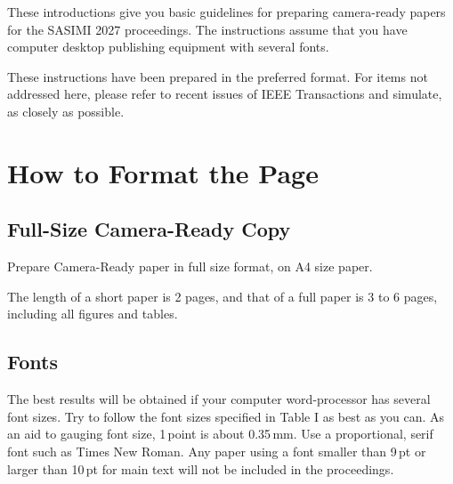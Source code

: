 \documentclass[twocolumn,a4paper]{article}
\begin{document}
These introductions give you basic guidelines for
preparing camera-ready papers for the SASIMI 2027 proceedings.
The instructions assume that you have computer desktop publishing equipment with several fonts.

These instructions have been prepared in the preferred format.
For items not addressed here, please refer to recent issues of IEEE Transactions and simulate,
as closely as possible.

\section{How to Format the Page}

\subsection{Full-Size Camera-Ready Copy}

Prepare Camera-Ready paper in full size format, on A4 size paper.

The length of a short paper is 2 pages, and that of a full paper is 3 to 6 pages, including all figures and tables.


\subsection{Fonts}

The best results will be obtained if your computer word-processor has several font sizes.
Try to follow the font sizes specified in Table I as best as you can.
As an aid to gauging font size, 1\,point is about 0.35\,mm.
Use a proportional, serif font such as Times New Roman.
Any paper using a font smaller than 9\,pt or larger than 10\,pt for main text will not be included in the proceedings.
\end{document}

